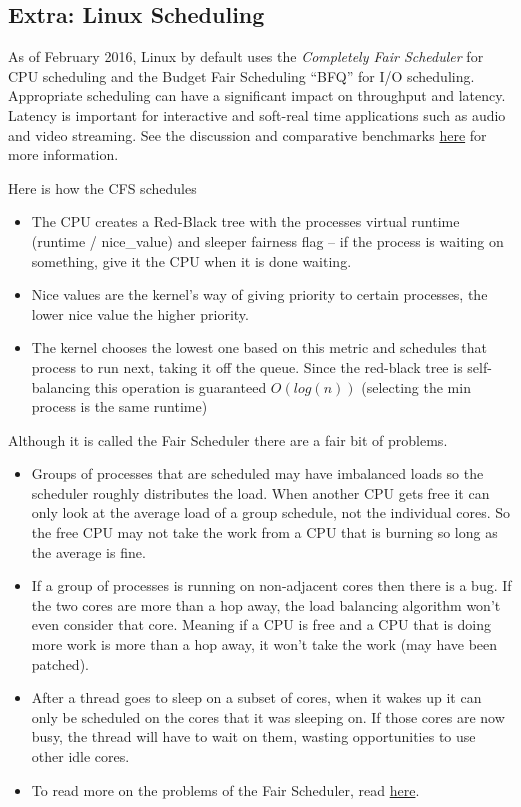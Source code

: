 \subsection{Extra: Linux Scheduling}

As of February 2016, Linux by default uses the \emph{Completely Fair Scheduler} for CPU scheduling and the Budget Fair Scheduling ``BFQ'' for I/O scheduling. Appropriate scheduling can have a significant impact on throughput and latency. Latency is important for interactive and soft-real time applications such as audio and video streaming. See the discussion and comparative benchmarks \href{https://lkml.org/lkml/2014/5/27/314}{here} for more information.

Here is how the CFS schedules

\begin{itemize}
\tightlist
\item
  The CPU creates a Red-Black tree with the processes virtual runtime (runtime / nice\_value) and sleeper fairness flag -- if the process is waiting on something, give it the CPU when it is done waiting.
\item
  Nice values are the kernel's way of giving priority to certain processes, the lower nice value the higher priority.
\item
  The kernel chooses the lowest one based on this metric and schedules that process to run next, taking it off the queue. Since the red-black tree is self-balancing this operation is guaranteed \(O(log(n))\) (selecting the min process is the same runtime)
\end{itemize}

Although it is called the Fair Scheduler there are a fair bit of problems.

\begin{itemize}
\tightlist
\item
  Groups of processes that are scheduled may have imbalanced loads so the scheduler roughly distributes the load. When another CPU gets free it can only look at the average load of a group schedule, not the individual cores. So the free CPU may not take the work from a CPU that is burning so long as the average is fine.
\item
  If a group of processes is running on non-adjacent cores then there is a bug. If the two cores are more than a hop away, the load balancing algorithm won't even consider that core. Meaning if a CPU is free and a CPU that is doing more work is more than a hop away, it won't take the work (may have been patched).
\item
  After a thread goes to sleep on a subset of cores, when it wakes up it can only be scheduled on the cores that it was sleeping on. If those cores are now busy, the thread will have to wait on them, wasting opportunities to use other idle cores.
\item
  To read more on the problems of the Fair Scheduler, read \href{https://blog.acolyer.org/2016/04/26/the-linux-scheduler-a-decade-of-wasted-cores}{here}.
\end{itemize}

